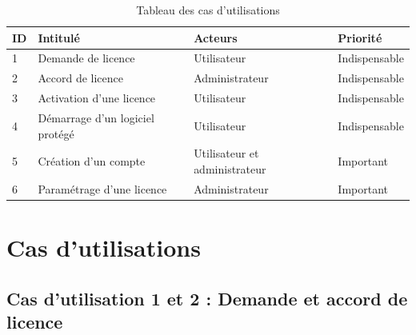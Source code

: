 \begin{table}[h]
	\centering
	\begin{tabular}{ | m{0.6cm} | m{6cm} | m{6cm}| m{3cm} | } 
                \hline
		\textbf{ID} & \textbf{Intitulé} & \textbf{Acteurs} & \textbf{Priorité} \\
        \hline
			1 & Demande de licence & Utilisateur & Indispensable \\
        \hline
			2 & Accord de licence & Administrateur & Indispensable \\
        \hline
			3 & Activation d'une licence & Utilisateur & Indispensable \\
        \hline
			4 & Démarrage d'un logiciel protégé & Utilisateur & Indispensable \\
		\hline
			5 & Création d'un compte & Utilisateur et administrateur & Important \\
		\hline
			6 & Paramétrage d'une licence & Administrateur & Important \\
		\hline
        \end{tabular}
	\caption{Tableau des cas d'utilisations}
	\label{tab:tab1}
\end{table}
\newpage

\section{Cas d'utilisations}

\subsection{Cas d'utilisation 1 et 2 : Demande et accord de licence}

